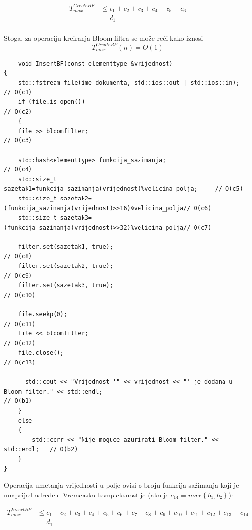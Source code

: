 \documentclass{foi}
\begin{document}
\begin{equation*}
    \begin{aligned}
    T^{CreateBF}_{max} & \leq c_1 + c_2 + c_3 + c_4 + c_5 + c_6\\
    & =  d_1 \\
    \end{aligned}
\end{equation*}

Stoga, za operaciju kreiranja Bloom filtra se može reći kako iznosi $$ T^{CreateBF}_{max} \left( n \right) = O \left( 1 \right)$$
\newpage
\begin{lstlisting}
    void InsertBF(const elementtype &vrijednost)
{
    std::fstream file(ime_dokumenta, std::ios::out | std::ios::in);         // O(c1)
    if (file.is_open())                                                     // O(c2)
    {
    file >> bloomfilter;                                                    // O(c3)

    std::hash<elementtype> funkcija_sazimanja;                              // O(c4)
    std::size_t sazetak1=funkcija_sazimanja(vrijednost)%velicina_polja;     // O(c5)
    std::size_t sazetak2=(funkcija_sazimanja(vrijednost)>>16)%velicina_polja// O(c6)
    std::size_t sazetak3=(funkcija_sazimanja(vrijednost)>>32)%velicina_polja// O(c7)

    filter.set(sazetak1, true);                                             // O(c8)
    filter.set(sazetak2, true);                                             // O(c9)
    filter.set(sazetak3, true);                                            // O(c10)

    file.seekp(0);                                                         // O(c11)
    file << bloomfilter;                                                   // O(c12)
    file.close();                                                          // O(c13)

      std::cout << "Vrijednost '" << vrijednost << "' je dodana u Bloom filter." << std::endl;                                                       // O(b1)
    }
    else
    {
        std::cerr << "Nije moguce azurirati Bloom filter." << std::endl;   // O(b2)
    }
}
\end{lstlisting}

Operacija umetanja vrijednosti u polje ovisi o broju funkcija sažimanja koji je unaprijed određen. Vremenska kompleksnost je (ako je $c_{14}=max \left\{ b_1, b_2 \right\}$):

\begin{equation*}
    \begin{aligned}
    T^{InsertBF}_{max} & \leq c_1 + c_2 + c_3 + c_4 + c_5 + c_6 + c_7 + c_8 + c_9 + c_{10} + c_{11} + c_{12} + c_{13} + c_{14}\\
    & =  d_1 \\
    \end{aligned}
\end{equation*}
\end{document}
